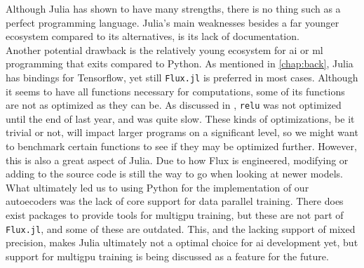 Although Julia has shown to have many strengths, there is no thing such as a perfect programming language. Julia's main weaknesses besides a far younger ecosystem compared to its alternatives, is its lack of documentation. \\

Another potential drawback is the relatively young ecosystem for \acrshort{ai} or \acrshort{ml} programming that exits compared to Python. As mentioned in \ref{chap:back}, Julia has bindings for Tensorflow, yet still \texttt{Flux.jl} is preferred in most cases. Although it seems to have all functions necessary for computations, some of its functions are not as optimized as they can be. As discussed in \cite{projthesis}, \lstinline|relu| was not optimized until the end of last year, and was quite slow. These kinds of optimizations, be it trivial or not, will impact larger programs on a significant level, so we might want to benchmark certain functions to see if they may be optimized further. However, this is also a great aspect of Julia. Due to how Flux is engineered, modifying or adding to the source code is still the way to go when looking at newer models. \\

What ultimately led us to using Python for the implementation of our autoecoders was the lack of core support for data parallel training. There does exist packages to provide tools for multigpu training, but these are not part of \texttt{Flux.jl}, and some of these are outdated. This, and the lacking support of mixed precision, makes Julia ultimately not a optimal choice for \acrshort{ai} development yet, but support for multigpu training is being discussed as a feature for the future.
